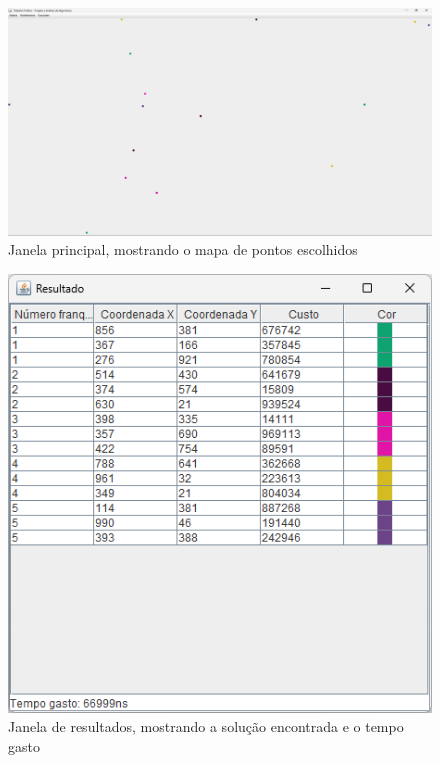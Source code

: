 \documentclass[12pt]{article}
\begin{document}
\begin{figure}
    \centering
    \includegraphics[width=\textwidth]{Captura de tela 2024-06-01 110914}
    \caption{Janela principal, mostrando o mapa de pontos escolhidos}
    \label{fig:fig-3}
\end{figure}

\begin{figure}
    \centering
    \includegraphics[width=\textwidth]{Captura de tela 2024-06-01 110920}
    \caption{Janela de resultados, mostrando a solução encontrada e o tempo gasto}
    \label{fig:fig-4}
\end{figure}
\end{document}
